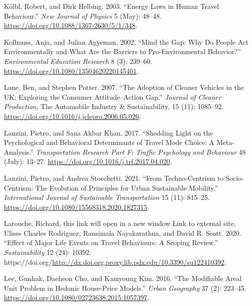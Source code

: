 \documentclass[
  11pt,
  openany]{memoir}
\newlength{\cslhangindent}
\newlength{\cslentryspacingunit} %
\newenvironment{CSLReferences}[2] %
 {%
  \setlength{\parindent}{0pt}
  \ifodd #1
  \let\oldpar\par
  \def\par{\hangindent=\cslhangindent\oldpar}
  \fi
  \setlength{\parskip}{#2\cslentryspacingunit}
 }%
 {}
\begin{document}
\begin{CSLReferences}{1}{0}
\leavevmode{}%
Kölbl, Robert, and Dirk Helbing. 2003. {``Energy Laws in Human Travel Behaviour.''} \emph{New Journal of Physics} 5 (May): 48--48. \url{https://doi.org/10.1088/1367-2630/5/1/348}.

\leavevmode{}%
Kollmuss, Anja, and Julian Agyeman. 2002. {``Mind the {Gap}: Why Do People Act Environmentally and What Are the Barriers to Pro-Environmental Behavior?''} \emph{Environmental Education Research} 8 (3): 239--60. \url{https://doi.org/10.1080/13504620220145401}.

\leavevmode{}%
Lane, Ben, and Stephen Potter. 2007. {``The Adoption of Cleaner Vehicles in the {UK}: Exploring the Consumer Attitude--Action Gap.''} \emph{Journal of Cleaner Production}, The {Automobile Industry} \& {Sustainability}, 15 (11): 1085--92. \url{https://doi.org/10.1016/j.jclepro.2006.05.026}.

\leavevmode{}%
Lanzini, Pietro, and Sana Akbar Khan. 2017. {``Shedding Light on the Psychological and Behavioral Determinants of Travel Mode Choice: A Meta-Analysis.''} \emph{Transportation Research Part F: Traffic Psychology and Behaviour} 48 (July): 13--27. \url{https://doi.org/10.1016/j.trf.2017.04.020}.

\leavevmode{}%
Lanzini, Pietro, and Andrea Stocchetti. 2021. {``From Techno-Centrism to Socio-Centrism: The Evolution of Principles for Urban Sustainable Mobility.''} \emph{International Journal of Sustainable Transportation} 15 (11): 815--25. \url{https://doi.org/10.1080/15568318.2020.1827315}.

\leavevmode{}%
Larouche, Richard, this link will open in a new window Link to external site, Ulises Charles Rodriguez, Ransimala Nayakarathna, and David R. Scott. 2020. {``Effect of {Major Life Events} on {Travel Behaviours}: A {Scoping Review}.''} \emph{Sustainability} 12 (24): 10392. https://doi.org/\url{http://dx.doi.org.proxy.lib.pdx.edu/10.3390/su122410392}.

\leavevmode{}%
Lee, Gunhak, Daeheon Cho, and Kamyoung Kim. 2016. {``The Modifiable Areal Unit Problem in Hedonic House-Price Models.''} \emph{Urban Geography} 37 (2): 223--45. \url{https://doi.org/10.1080/02723638.2015.1057397}.


\end{CSLReferences}
\end{document}
